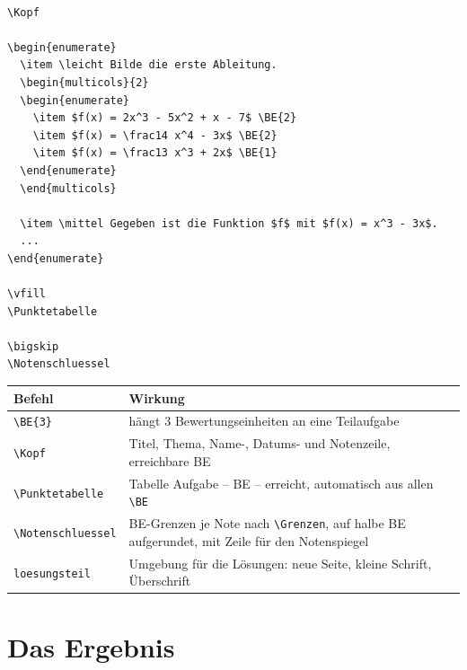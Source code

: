 \begin{lstlisting}[style=latex]

\Kopf

\begin{enumerate}
  \item \leicht Bilde die erste Ableitung.
  \begin{multicols}{2}
  \begin{enumerate}
    \item $f(x) = 2x^3 - 5x^2 + x - 7$ \BE{2}
    \item $f(x) = \frac14 x^4 - 3x$ \BE{2}
    \item $f(x) = \frac13 x^3 + 2x$ \BE{1}
  \end{enumerate}
  \end{multicols}

  \item \mittel Gegeben ist die Funktion $f$ mit $f(x) = x^3 - 3x$.
  ...
\end{enumerate}

\vfill
\Punktetabelle

\bigskip
\Notenschluessel
\end{lstlisting}

\begin{center}
\begin{tabular}{@{}l>{\raggedright\arraybackslash}p{11cm}@{}}
	\toprule
	\textbf{Befehl} & \textbf{Wirkung} \\
	\midrule
	\texttt{\textbackslash BE\{3\}} & hängt 3 Bewertungseinheiten an eine Teilaufgabe \\
	\texttt{\textbackslash Kopf} & Titel, Thema, Name-, Datums- und Notenzeile, erreichbare BE \\
	\texttt{\textbackslash Punktetabelle} & Tabelle Aufgabe -- BE -- erreicht, automatisch aus allen \texttt{\textbackslash BE} \\
	\texttt{\textbackslash Notenschluessel} & BE-Grenzen je Note nach \texttt{\textbackslash Grenzen}, auf halbe BE aufgerundet, mit Zeile für den Notenspiegel \\
	\texttt{loesungsteil} & Umgebung für die Lösungen: neue Seite, kleine Schrift, Überschrift \\
	\bottomrule
\end{tabular}
\end{center}



\section{Das Ergebnis}

